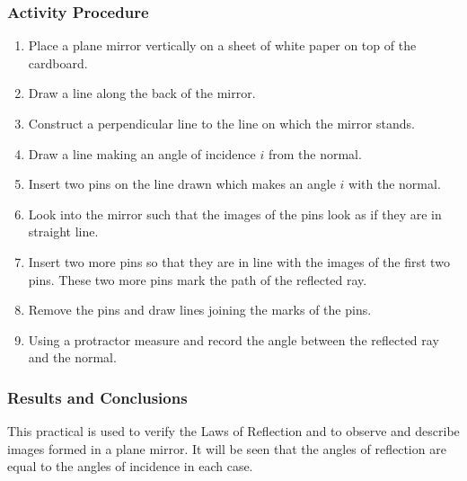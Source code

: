 \subsubsection{Activity Procedure}
\begin{enumerate}
\item{Place a plane mirror vertically on a sheet of white paper on top of the cardboard.}
\item{Draw a line along the back of the mirror.}
\item{Construct a perpendicular line to the line on which the mirror stands.}  
\item{Draw a line making an angle of incidence $i$ from the normal.}
\item{Insert two pins on the line drawn which makes an angle $i$ with the normal.}
\item{Look into the mirror such that the images of the pins look as if they are in straight line.}
\item{Insert two more pins so that they are in line with the images of the first two pins.  These two more pins mark the path of the reflected ray.}
\item{Remove the pins and draw lines joining the marks of the pins.}
\item{Using a protractor measure and record the angle between the reflected ray and the normal.}
\end{enumerate}

\subsubsection*{Results and Conclusions}
This practical is used to verify the Laws of Reflection and to observe and describe images formed in a plane mirror.  It will be seen that the angles of reflection are equal to the angles of incidence in each case.
